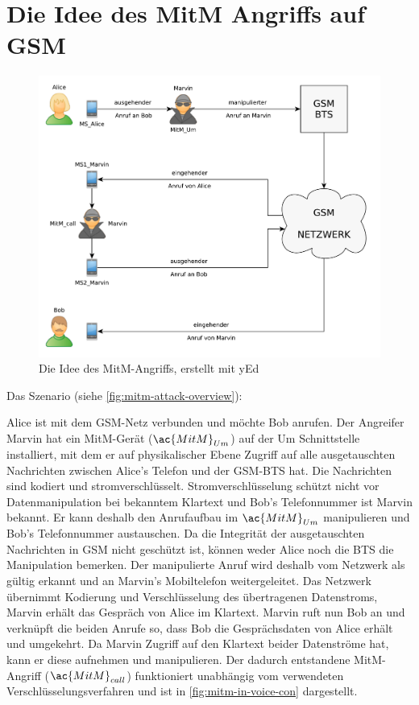 \section{Die Idee des \acl{MitM} Angriffs auf GSM} \label{hdl:einleitung_mitm-gsm}

\begin{figure}[H]
	\centering \includegraphics[width=0.9\linewidth]{figures/mitm_attack_overview.pdf}
	\caption[Die Idee des MitM-Angriffs]{Die Idee des \ac{MitM}-Angriffs, erstellt mit yEd} \label{fig:mitm-attack-overview}
\end{figure}

Das Szenario (siehe \autoref{fig:mitm-attack-overview}):

Alice ist mit dem \ac{GSM}-Netz verbunden und möchte Bob anrufen. Der Angreifer Marvin hat ein \ac{MitM}-Gerät ($\ac{MitM}_{Um}$) auf der \ac{Um} Schnittstelle installiert, mit dem er auf physikalischer Ebene Zugriff auf alle ausgetauschten Nachrichten zwischen Alice's Telefon und der \ac{GSM}-\ac{BTS} hat. Die Nachrichten sind kodiert und stromverschlüsselt. Stromverschlüsselung schützt nicht vor Datenmanipulation bei bekanntem Klartext und Bob's Telefonnummer ist Marvin bekannt. Er kann deshalb den Anrufaufbau im $\ac{MitM}_{Um}$ manipulieren und Bob's Telefonnummer austauschen. Da die Integrität der ausgetauschten Nachrichten in \ac{GSM} nicht geschützt ist, können weder Alice noch die \ac{BTS} die Manipulation bemerken. Der manipulierte Anruf wird deshalb vom Netzwerk als gültig erkannt und an Marvin's Mobiltelefon weitergeleitet. Das Netzwerk übernimmt Kodierung und Verschlüsselung des übertragenen Datenstroms, Marvin erhält das Gespräch von Alice im Klartext. Marvin ruft nun Bob an und verknüpft die beiden Anrufe so, dass Bob die Gesprächsdaten von Alice erhält und umgekehrt. Da Marvin Zugriff auf den Klartext beider Datenströme hat, kann er diese aufnehmen und manipulieren. Der dadurch entstandene \ac{MitM}-Angriff ($\ac{MitM}_{call}$) funktioniert unabhängig vom verwendeten Verschlüsselungsverfahren und ist in \autoref{fig:mitm-in-voice-con} dargestellt.

